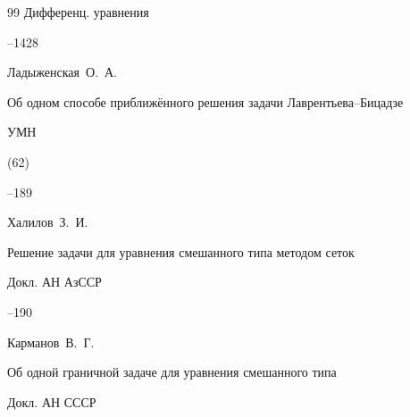 \begin{thebibliography}{99}
\jour Дифференц. уравнения




--1428













\by Ладыженская~О.~А.

\paper Об одном способе приближённого решения задачи Лаврентьева--Бицадзе

\jour УМН



(62)

--189







\by Халилов~З.~И.

\paper Решение задачи для уравнения смешанного типа методом сеток

\jour Докл. АН АзССР




--190




\by Карманов~В.~Г.

\paper Об одной граничной задаче для уравнения смешанного типа

\jour Докл. АН СССР




\end{thebibliography}
